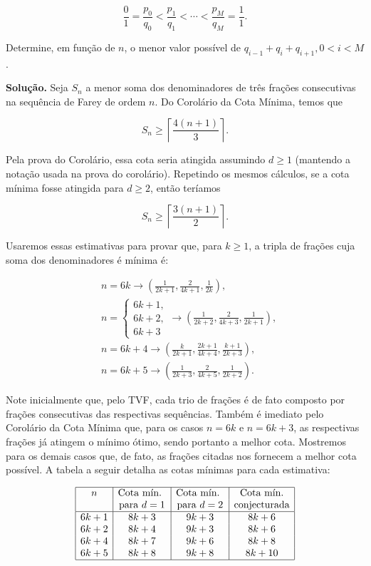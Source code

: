 \documentclass{hipatia}
\theoremstyle{definition} %
\begin{document}
$$ \frac{0}{1} = \frac{p_0}{q_0} < \frac{p_1}{q_1} < \cdots < \frac{p_M}{q_M} = \frac{1}{1}. $$

\noindent Determine, em função de $n$, o menor valor possível de $q_{i-1} + q_i + q_{i+1}, 0 < i < M$.  \vspace{0.2cm}

\noindent \textbf{Solução.} Seja $S_n$ a menor soma dos denominadores de três frações consecutivas na sequência de Farey de ordem \( n \). Do Corolário da Cota Mínima, temos que 

$$
S_n \geq \left\lceil \frac{4(n+1)}{3} \right\rceil.
$$

Pela prova do Corolário, essa cota seria atingida assumindo \(d \geq 1\) (mantendo a notação usada na prova do corolário). Repetindo os mesmos cálculos, se a cota mínima fosse atingida para \(d \geq 2\), então teríamos

$$
S_n \geq \left\lceil \frac{3(n+1)}{2} \right\rceil.
$$

Usaremos essas estimativas para provar que, para \(k \geq 1\), a tripla de frações cuja soma dos denominadores é mínima é:

\[
\begin{aligned}
& n = 6k \rightarrow \left(\frac{1}{2k+1}, \frac{2}{4k+1}, \frac{1}{2k}\right), \\
& n =
\begin{cases}
6k+1, \\
6k+2, \\
6k+3
\end{cases}
\rightarrow \left(\frac{1}{2k+2}, \frac{2}{4k+3}, \frac{1}{2k+1}\right), \\
& n = 6k+4 \rightarrow \left(\frac{k}{2k+1}, \frac{2k+1}{4k+4}, \frac{k+1}{2k+3}\right), \\
& n = 6k+5 \rightarrow \left(\frac{1}{2k+3}, \frac{2}{4k+5}, \frac{1}{2k+2}\right).
\end{aligned}
\]

Note inicialmente que, pelo TVF, cada trio de frações é de fato composto por frações consecutivas das respectivas sequências. Também é imediato pelo Corolário da Cota Mínima que, para os casos \(n=6k\) e \(n=6k+3\), as respectivas frações já atingem o mínimo ótimo, sendo portanto a melhor cota. Mostremos para os demais casos que, de fato, as frações citadas nos fornecem a melhor cota possível. A tabela a seguir detalha as cotas mínimas para cada estimativa:

$$
\begin{array}{|c|c|c|c|}
\hline
n & \text{Cota mín. }& \text{Cota mín. }& \text{Cota mín.}\\
&\text{para }d=1&\text{para }d=2& \text{conjecturada}\\
\hline
6k+1 & 8k+3 & 9k+3 & 8k+6 \\
6k+2 & 8k+4 & 9k+3 & 8k+6 \\
6k+4 & 8k+7 & 9k+6 & 8k+8 \\
6k+5 & 8k+8 & 9k+8 & 8k+10 \\
\hline
\end{array}
$$
\end{document}
